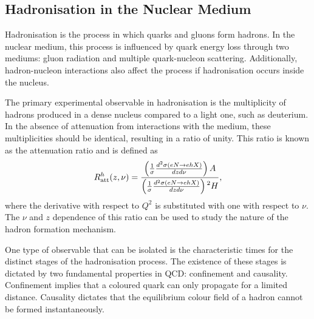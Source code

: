 \subsection{Hadronisation in the Nuclear Medium}
\label{10.30::hadronisation_in_the_nuclear_medium}
    Hadronisation is the process in which quarks and gluons form hadrons.
    In the nuclear medium, this process is influenced by quark energy loss through two mediums: gluon radiation and multiple quark-nucleon scattering.
    Additionally, hadron-nucleon interactions also affect the process if hadronisation occurs inside the nucleus.

    The primary experimental observable in hadronisation is the multiplicity of hadrons produced in a dense nucleus compared to a light one, such as deuterium.
    In the absence of attenuation from interactions with the medium, these multiplicities should be identical, resulting in a ratio of unity.
    This ratio is known as the attenuation ratio and is defined as
    \begin{equation*}
        R^h_{\text{att}}(z,\nu) = \frac
            {\left( \frac{1}{\sigma} \frac{d^2\sigma(eN \rightarrow ehX)}{dzd\nu} \right)A}
            {\left( \frac{1}{\sigma} \frac{d^2\sigma(eN \rightarrow ehX)}{dzd\nu} \right){\prescript{2}{}{H}}},
    \end{equation*}
    where the derivative with respect to $Q^2$ is substituted with one with respect to $\nu$.
    The $\nu$ and $z$ dependence of this ratio can be used to study the nature of the hadron formation mechanism.

    One type of observable that can be isolated is the characteristic times for the distinct stages of the hadronisation process.
    The existence of these stages is dictated by two fundamental properties in QCD: confinement and causality.
    Confinement implies that a coloured quark can only propagate for a limited distance.
    Causality dictates that the equilibrium colour field of a hadron cannot be formed instantaneously.

    
    
    
